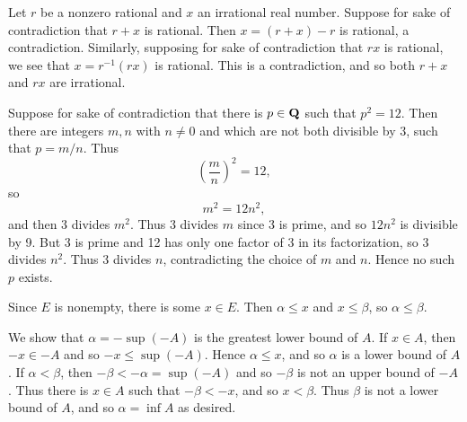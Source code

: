 \begin{ex}
Let $r$ be a nonzero rational and $x$ an irrational real number. Suppose for sake of contradiction that $r + x$ is rational. Then $x = (r + x) - r$ is rational, a contradiction. Similarly, supposing for sake of contradiction that $rx$ is rational, we see that $x = r^{-1}(rx)$ is rational. This is a contradiction, and so both $r + x$ and $rx$ are irrational.
\end{ex}

\begin{ex}
Suppose for sake of contradiction that there is $p \in \mathbf{Q}$ such that $p^2 = 12$. Then there are integers $m, n$ with $n \not = 0$ and which are not both divisible by 3, such that $p = m/n$. Thus \[\left(\frac{m}{n}\right)^2 = 12,\] so \[m^2 = 12n^2,\] and then 3 divides $m^2$. Thus 3 divides $m$ since 3 is prime, and so $12n^2$ is divisible by 9. But 3 is prime and 12 has only one factor of 3 in its factorization, so 3 divides $n^2$. Thus 3 divides $n$, contradicting the choice of $m$ and $n$. Hence no such $p$ exists.
\end{ex}

\begin{ex}
[TODO]
\end{ex}

\begin{ex}
Since $E$ is nonempty, there is some $x \in E$. Then $\alpha \leq x$ and $x \leq \beta$, so $\alpha \leq \beta$.
\end{ex}

\begin{ex}
We show that $\alpha = -\sup(-A)$ is the greatest lower bound of $A$. If $x \in A$, then $-x \in -A$ and so $-x \leq \sup(-A)$. Hence $\alpha \leq x$, and so $\alpha$ is a lower bound of $A$. If $\alpha < \beta$, then $-\beta < -\alpha = \sup(-A)$ and so $-\beta$ is not an upper bound of $-A$. Thus there is $x \in A$ such that $-\beta < -x$, and so $x < \beta$. Thus $\beta$ is not a lower bound of $A$, and so $\alpha = \inf A$ as desired.
\end{ex}

